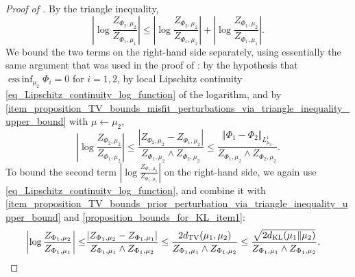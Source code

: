 \documentclass[a4paper]{scrartcl}
\theoremstyle{definition}
\numberwithin{equation}{section}
\DeclareMathOperator*{\essinf}{ess\,inf}
\newcommand{\Abs}[1]{\left\vert#1\right\vert}
\newcommand{\norm}[1]{\Vert #1 \Vert}
\newcommand{\KL}[0]{\textup{KL}}
\newcommand{\TV}[0]{\textup{TV}}
\begin{document}
\begin{proof}[Proof of ]
By the triangle inequality,
\begin{equation*}
 \Abs{\log \frac{Z_{\Phi_2,\mu_2}}{Z_{\Phi_1,\mu_1}}}\leq \Abs{\log \frac{Z_{\Phi_2,\mu_2}}{Z_{\Phi_1,\mu_2}}}+\Abs{\log \frac{Z_{\Phi_1,\mu_2}}{Z_{\Phi_1,\mu_1}}}.
 \end{equation*}
We bound the two terms on the right-hand side separately, using essentially the same argument that was used in the proof of \cite[Theorem 11]{Sprungk2020}: by the hypothesis that $\essinf_{\mu_2}\Phi_i=0$ for $i=1,2$, by local Lipschitz continuity \eqref{eq_Lipschitz_continuity_log_function} of the logarithm, and by \ref{item_proposition_TV_bounds_misfit_perturbations_via_triangle_inequality_upper_bound} with $\mu\leftarrow \mu_2$,
 \begin{equation*}
   \Abs{\log \frac{Z_{\Phi_2,\mu_2}}{Z_{\Phi_1,\mu_2}}} \leq \frac{\Abs{Z_{\Phi_2,\mu_2}-Z_{\Phi_1,\mu_2}}}{Z_{\Phi_1,\mu_2}\wedge Z_{\Phi_2,\mu_2}}\leq \frac{\norm{\Phi_1-\Phi_2}_{L^1_{\mu_2}}}{Z_{\Phi_1,\mu_2}\wedge Z_{\Phi_2,\mu_2}}.
 \end{equation*}
 To bound the second term $\Abs{\log \tfrac{Z_{\Phi_1,\mu_2}}{Z_{\Phi_1,\mu_1}}}$ on the right-hand side, we again use \eqref{eq_Lipschitz_continuity_log_function}, and combine it with \ref{item_proposition_TV_bounds_prior_perturbation_via_triangle_inequality_upper_bound} and \ref{proposition_bounds_for_KL_item1}:
 \begin{align*}
  \Abs{\log \frac{Z_{\Phi_1,\mu_2}}{Z_{\Phi_1,\mu_1}}}\leq & \frac{\Abs{Z_{\Phi_1,\mu_2}-Z_{\Phi_1,\mu_1}}}{Z_{\Phi_1,\mu_1}\wedge Z_{\Phi_1,\mu_2}} \leq \frac{2d_{\TV}(\mu_1,\mu_2)}{Z_{\Phi_1,\mu_1}\wedge Z_{\Phi_1,\mu_2}}
  \leq \frac{\sqrt{2d_{\KL}(\mu_1\Vert \mu_2)}}{Z_{\Phi_1,\mu_1}\wedge Z_{\Phi_1,\mu_2}}.
 \end{align*}
  

\end{proof}
\end{document}
